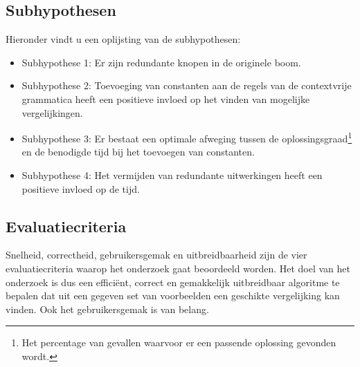 \documentclass[Main.tex]{subfiles}
\begin{document}
\subsection{Subhypothesen} \label{ssec:subhypothesen}
\par Hieronder vindt u een oplijsting van de subhypothesen:

\begin{itemize}
\item Subhypothese 1: Er zijn redundante knopen in de originele boom.
\item Subhypothese 2: Toevoeging van constanten aan de regels van de contextvrije grammatica heeft een positieve invloed op het vinden van mogelijke vergelijkingen.
\item Subhypothese 3: Er bestaat een optimale afweging tussen de oplossingsgraad\footnote{\label{note:oplossingsgraad}Het percentage van gevallen waarvoor er een passende oplossing gevonden wordt.} en de benodigde tijd bij het toevoegen van constanten.
\item Subhypothese 4: Het vermijden van redundante uitwerkingen heeft een positieve invloed op de tijd. 
\end{itemize}

\subsection{Evaluatiecriteria}

Snelheid, correctheid, gebruikersgemak en uitbreidbaarheid zijn de vier evaluatiecriteria waarop het onderzoek gaat beoordeeld worden. Het doel van het onderzoek is dus een effici\"ent, correct en gemakkelijk uitbreidbaar algoritme te bepalen dat uit een gegeven set van voorbeelden een geschikte vergelijking kan vinden. Ook het gebruikersgemak is van belang.
\end{document}
